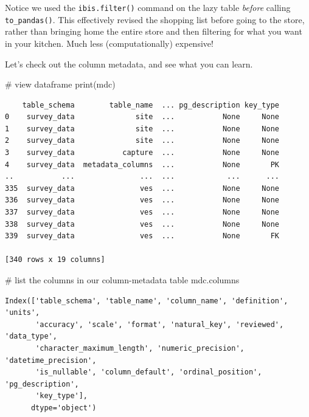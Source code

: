 \documentclass[
  letterpaper,
  DIV=11,
  numbers=noendperiod]{scrartcl}
\newenvironment{Shaded}{\begin{snugshade}}{\end{snugshade}}
\newcommand{\BuiltInTok}[1]{\textcolor[rgb]{0.00,0.23,0.31}{#1}}
\newcommand{\CommentTok}[1]{\textcolor[rgb]{0.37,0.37,0.37}{#1}}
\newcommand{\NormalTok}[1]{\textcolor[rgb]{0.00,0.23,0.31}{#1}}
\begin{document}
Notice we used the \texttt{ibis.filter()} command on the lazy table
\emph{before} calling \texttt{to\_pandas()}. This effectively revised
the shopping list before going to the store, rather than bringing home
the entire store and then filtering for what you want in your kitchen.
Much less (computationally) expensive!

Let's check out the column metadata, and see what you can learn.

\begin{Shaded}
\begin{Highlighting}[]
\CommentTok{\# view dataframe}
\BuiltInTok{print}\NormalTok{(mdc)}
\end{Highlighting}
\end{Shaded}

\begin{verbatim}
    table_schema        table_name  ... pg_description key_type
0    survey_data              site  ...           None     None
1    survey_data              site  ...           None     None
2    survey_data              site  ...           None     None
3    survey_data           capture  ...           None     None
4    survey_data  metadata_columns  ...           None       PK
..           ...               ...  ...            ...      ...
335  survey_data               ves  ...           None     None
336  survey_data               ves  ...           None     None
337  survey_data               ves  ...           None     None
338  survey_data               ves  ...           None     None
339  survey_data               ves  ...           None       FK

[340 rows x 19 columns]
\end{verbatim}

\begin{Shaded}
\begin{Highlighting}[]
\CommentTok{\# list the columns in our column{-}metadata table}
\NormalTok{mdc.columns}
\end{Highlighting}
\end{Shaded}

\begin{verbatim}
Index(['table_schema', 'table_name', 'column_name', 'definition', 'units',
       'accuracy', 'scale', 'format', 'natural_key', 'reviewed', 'data_type',
       'character_maximum_length', 'numeric_precision', 'datetime_precision',
       'is_nullable', 'column_default', 'ordinal_position', 'pg_description',
       'key_type'],
      dtype='object')
\end{verbatim}
\end{document}
